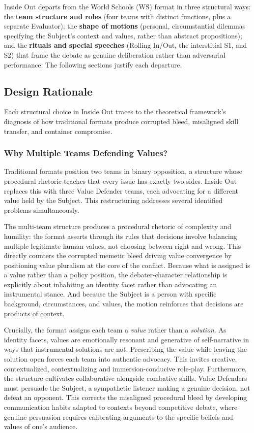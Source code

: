 Inside Out departs from the World Schools (WS) format in three structural ways: the \textbf{team structure and roles} (four teams with distinct functions, plus a separate Evaluator); the \textbf{shape of motions} (personal, circumstantial dilemmas specifying the Subject's context and values, rather than abstract propositions); and the \textbf{rituals and special speeches} (Rolling In/Out, the interstitial S1, and S2) that frame the debate as genuine deliberation rather than adversarial performance. The following sections justify each departure.

\subsection{Design Rationale}

Each structural choice in Inside Out traces to the theoretical framework's diagnosis of how traditional formats produce corrupted bleed, misaligned skill transfer, and container compromise.

\subsubsection{Why Multiple Teams Defending Values?}

Traditional formats position two teams in binary opposition, a structure whose procedural rhetoric \parencite{bogost2007persuasive} teaches that every issue has exactly two sides. Inside Out replaces this with three Value Defender teams, each advocating for a different value held by the Subject. This restructuring addresses several identified problems simultaneously.

The multi-team structure produces a procedural rhetoric of complexity and humility: the format asserts through its rules that decisions involve balancing multiple legitimate human values, not choosing between right and wrong. This directly counters the corrupted memetic bleed driving value convergence by positioning value pluralism at the core of the conflict. Because what is assigned is a value rather than a policy position, the debater-character relationship is explicitly about inhabiting an identity facet rather than advocating an instrumental stance. And because the Subject is a person with specific background, circumstances, and values, the motion reinforces that decisions are products of context.

Crucially, the format assigns each team a \textit{value} rather than a \textit{solution}. As identity facets, values are emotionally resonant and generative of self-narrative in ways that instrumental solutions are not. Prescribing the value while leaving the solution open forces each team into authentic advocacy. This invites creative, contextualized, contextualizing and immersion-conducive role-play. Furthermore, the structure cultivates collaborative alongside combative skills. Value Defenders must persuade the Subject, a sympathetic listener making a genuine decision, not defeat an opponent. This corrects the misaligned procedural bleed by developing communication habits adapted to contexts beyond competitive debate, where genuine persuasion requires calibrating arguments to the specific beliefs and values of one's audience.

